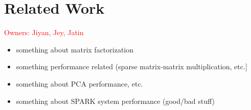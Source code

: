 \section{Related Work}
\label{sec:related}

\textcolor{red}{Owners: Jiyan, Jey, Jatin}
\begin{itemize}
  \item something about matrix factorization
  \item something performance related (sparse matrix-matrix multiplication, etc.] 
  \item something about PCA performance, etc.
  \item something about SPARK system performance (good/bad stuff)
\end{itemize}
